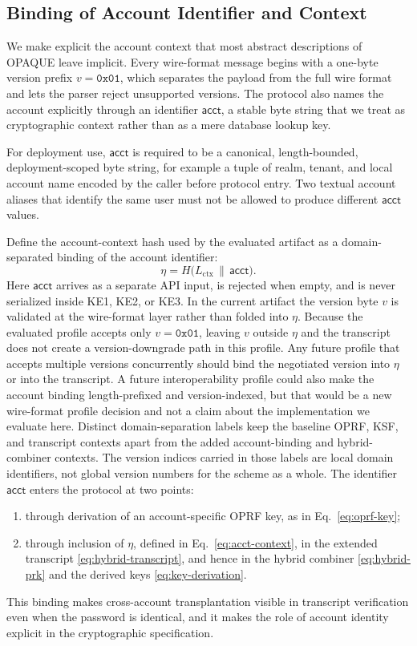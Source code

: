 \documentclass{ieeeijc}
\newcommand{\acct}{\mathsf{acct}}
\newcommand{\Label}[1]{L_{\mathrm{#1}}}
\theoremstyle{remark}
\begin{document}
\subsection{Binding of Account Identifier and Context}

We make explicit the account context that most abstract descriptions of OPAQUE leave implicit. Every wire-format message begins with a one-byte version prefix $v = \mathtt{0x01}$, which separates the payload from the full wire format and lets the parser reject unsupported versions. The protocol also names the account explicitly through an identifier $\acct$, a stable byte string that we treat as cryptographic context rather than as a mere database lookup key.

For deployment use, $\acct$ is required to be a canonical, length-bounded,
deployment-scoped byte string, for example a tuple of realm, tenant, and
local account name encoded by the caller before protocol entry. Two textual
account aliases that identify the same user must not be allowed to produce
different $\acct$ values.

Define the account-context hash used by the evaluated artifact as a
domain-separated binding of the account identifier:
\begin{equation}
  \eta =
  H\!\bigl(
    \Label{ctx} \,\|\, \acct
  \bigr).
  \label{eq:acct-context}
\end{equation}
Here $\acct$ arrives as a separate API input, is rejected when empty, and is never serialized inside KE1, KE2, or KE3. In the current artifact the version byte $v$ is validated at the wire-format layer rather than folded into $\eta$. Because the evaluated profile accepts only $v=\mathtt{0x01}$, leaving $v$ outside $\eta$ and the transcript does not create a version-downgrade path in this profile. Any future profile that accepts multiple versions concurrently should bind the negotiated version into $\eta$ or into the transcript. A future interoperability profile could also make the account binding length-prefixed and version-indexed, but that would be a new wire-format profile decision and not a claim about the implementation we evaluate here. Distinct domain-separation labels keep the baseline OPRF, KSF, and transcript contexts apart from the added account-binding and hybrid-combiner contexts. The version indices carried in those labels are local domain identifiers, not global version numbers for the scheme as a whole. The identifier $\acct$ enters the protocol at two points:
\begin{enumerate}
  \item through derivation of an account-specific OPRF key, as in
        Eq.~\eqref{eq:oprf-key};
  \item through inclusion of $\eta$, defined in
        Eq.~\eqref{eq:acct-context}, in the extended transcript
        \eqref{eq:hybrid-transcript}, and hence in the hybrid combiner
        \eqref{eq:hybrid-prk} and the derived keys
        \eqref{eq:key-derivation}.
\end{enumerate}
This binding makes cross-account transplantation visible in transcript
verification even when the password is identical, and it makes the role
of account identity explicit in the cryptographic specification.
\end{document}
